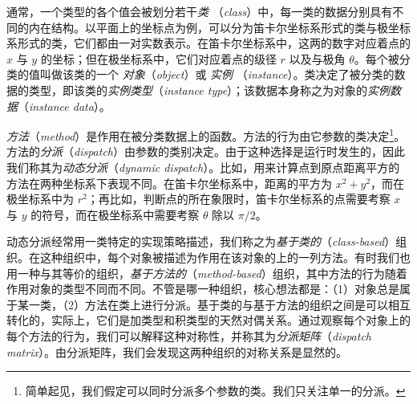 通常，一个类型的各个值会被划分若干\textit{类} （\textit{class}）中，每一类的数据分别具有不同的内在结构。以平面上的坐标点为例，可以分为笛卡尔坐标系形式的类与极坐标系形式的类，它们都由一对实数表示。在笛卡尔坐标系中，这两的数字对应着点的 $ x $ 与 $ y $ 的坐标；但在极坐标系中，它们对应着点的级径 $ r $ 以及与极角 $ \theta $。每个被分类的值叫做该类的一个 \textit{对象}（\textit{object}）或 \textit{实例} （\textit{instance}）。类决定了被分类的数据的类型，即该类的\textit{实例类型}（\textit{instance type}）；该数据本身称之为对象的\textit{实例数据}（\textit{instance data}）。

\textit{方法}（\textit{method}）是作用在被分类数据上的函数。方法的行为由它参数的类决定\footnote[1]{简单起见，我们假定可以同时分派多个参数的类。我们只关注单一的分派。}。方法的\textit{分派}（\textit{dispatch}）由参数的类别决定。由于这种选择是运行时发生的，因此我们称其为\textit{动态分派}（\textit{dynamic dispatch}）。比如，用来计算点到原点距离平方的方法在两种坐标系下表现不同。在笛卡尔坐标系中，距离的平方为 $x^2 + y^2$，而在极坐标系中为 $r^2$；再比如，判断点的所在象限时，笛卡尔坐标系的点需要考察 $ x $ 与 $ y $ 的符号，而在极坐标系中需要考察 $ \theta $ 除以 $ \pi / 2 $。

动态分派经常用一类特定的实现策略描述，我们称之为\textit{基于类的}（\textit{class-based}）组织。在这种组织中，每个对象被描述为作用在该对象的上的一列方法。有时我们也用一种与其等价的组织，\textit{基于方法的}（\textit{method-based}）组织，其中方法的行为随着作用对象的类型不同而不同。不管是哪一种组织，核心想法都是：（1）对象总是属于某一类，（2）方法在类上进行分派。基于类的与基于方法的组织之间是可以相互转化的，实际上，它们是加类型和积类型的天然对偶关系。通过观察每个对象上的每个方法的行为，我们可以解释这种对称性，并称其为\textit{分派矩阵}（\textit{dispatch matrix}）。由分派矩阵，我们会发现这两种组织的对称关系是显然的。
